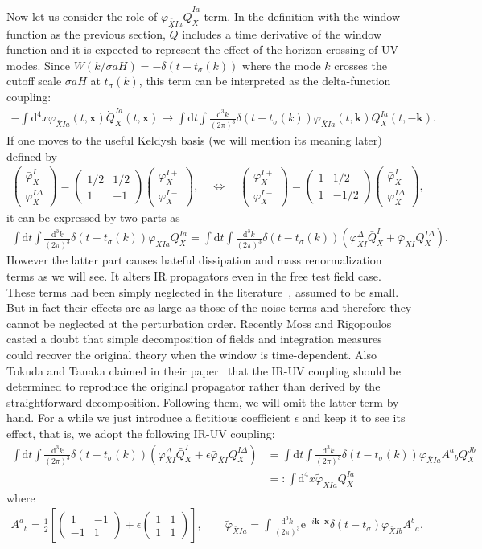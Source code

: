 \documentclass[a4paper,11pt]{article}
\newcommand{\dd}{\mathrm{d}}
\newcommand{\ee}{\mathrm{e}}
\newcommand{\dk}{\frac{\dd^3k}{(2\pi)^3}}
\newcommand{\bae}[1]{\begin{align} #1 \end{align}}
\newcommand{\bpme}[1]{\begin{pmatrix} #1 \end{pmatrix}}
\begin{document}
Now let us consider the role of $\varphi_{\bar{X}Ia}\dot{Q}_{X}^{Ia}$ term. In the definition with the window function as the previous section,
$\dot{Q}$ includes a time derivative of the window function and it is expected to represent the effect of the horizon crossing of UV modes.
Since $\dot{W}(k/\sigma aH)=-\delta(t-t_\sigma(k))$ where the mode $k$ crosses the cutoff scale $\sigma aH$ at $t_\sigma(k)$,
this term can be interpreted as the delta-function coupling:
\bae{\label{eq: IR-UV coupling}
	-\int\dd^4x\varphi_{\bar{X}Ia}(t,\mathbf{x})\dot{Q}_{X}^{Ia}(t,\mathbf{x})\to
	\int\dd t\int\dk\delta(t-t_\sigma(k))\varphi_{\bar{X}Ia}(t,\mathbf{k})Q_{X}^{Ia}(t,-\mathbf{k}).
}
If one moves to the useful Keldysh basis (we will mention its meaning later) defined by
\bae{\label{eq: Keldysh}
	\bpme{
		\bar{\varphi}_X^I \\
		\varphi_X^{I\Delta}
	}=\bpme{
		1/2 & 1/2 \\
		1 & -1
	}\bpme{
		\varphi_X^{I+} \\
		\varphi_X^{I-}
	}, \quad \Leftrightarrow \quad
	\bpme{
		\varphi_X^{I+} \\
		\varphi_X^{I-}
	}=\bpme{
		1 & 1/2 \\
		1 & -1/2
	}\bpme{
		\bar{\varphi}_X^I \\
		\varphi_X^{I\Delta}
	},
}
it can be expressed by two parts as
\bae{\label{eq: IR-UV in Keldysh}
	\int\dd t\int\dk\delta(t-t_\sigma(k))\varphi_{\bar{X}Ia}Q_{X}^{Ia}=
	\int\dd t\int\dk\delta(t-t_\sigma(k))\left(\varphi_{\bar{X}I}^{\Delta}\bar{Q}_{X}^I+\bar{\varphi}_{\bar{X}I}Q_{X}^{I\Delta}\right).
}
However the latter part causes hateful dissipation and mass renormalization terms as we will see. 
It alters IR propagators even in the free test field case.
These terms had been simply neglected in the literature~\cite{Morikawa:1989xz,Matarrese:2003ye,Levasseur:2013ffa}, assumed to be small.
But in fact their effects are as large as those of the noise terms and therefore they cannot be neglected at the perturbation order.
Recently Moss and Rigopoulos~\cite{Moss:2016uix} casted a doubt 
that simple decomposition of fields and integration measures could recover the original theory
when the window is time-dependent. Also Tokuda and Tanaka claimed in their paper~\cite{Tokuda:2017fdh} that
the IR-UV coupling should be determined to reproduce the original propagator rather than derived by the straightforward decomposition.
Following them, we will omit the latter term by hand. For a while we just introduce a fictitious coefficient $\epsilon$ and keep it to see
its effect, that is, we adopt the following IR-UV coupling:
\bae{
	\int\dd t\int\dk\delta(t-t_\sigma(k))\left(\varphi_{\bar{X}I}^{\Delta}\bar{Q}_{X}^I+\epsilon \bar{\varphi}_{\bar{X}I}Q_{X}^{I\Delta}\right)
	&=\int\dd t\int\dk\delta(t-t_\sigma(k))\varphi_{\bar{X}Ia}A^a{}_bQ_{X}^{Jb} \nonumber \\
	&=:\int\dd^4x\tilde{\varphi}_{\bar{X}Ia}Q_{X}^{Ia}
}
where
\bae{
	A^a{}_b=\frac{1}{2}\left[\bpme{
		1 & -1 \\
		-1 & 1	
	}+\epsilon\bpme{
		1 & 1 \\
		1 & 1
	}\right], \quad\quad \tilde{\varphi}_{\bar{X}Ia}=\int\dk\ee^{-i\mathbf{k}\cdot{\mathbf{x}}}\delta(t-t_\sigma)\varphi_{\bar{X}Ib}A^b{}_a.
}
\end{document}
